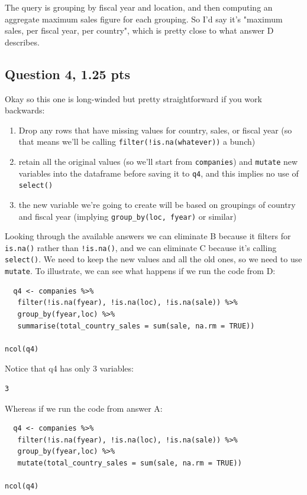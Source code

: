 \documentclass[11pt]{article}
\begin{document}
The query is grouping by fiscal year and location, and then computing an aggregate maximum sales figure for each grouping.  So I'd say it's "maximum sales, per fiscal year, per country", which is pretty close to what answer D describes.

\subsection*{Question 4, 1.25 pts}
\label{sec:orga215add}
Okay so this one is long-winded but pretty straightforward if you work backwards:

\begin{enumerate}
\item Drop any rows that have missing values for country, sales, or fiscal year (so that means we'll be calling \texttt{filter(!is.na(whatever))} a bunch)
\item retain all the original values (so we'll start from \texttt{companies}) and \texttt{mutate} new variables into the dataframe before saving it to \texttt{q4}, and this implies no use of \texttt{select()}
\item the new variable we're going to create will be based on groupings of country and fiscal year (implying \texttt{group\_by(loc, fyear)} or similar)
\end{enumerate}


Looking through the available answers we can eliminate B because it filters for \texttt{is.na()} rather than \texttt{!is.na()}, and we can eliminate C because it's calling \texttt{select()}.  We need to keep the new values and all the old ones, so we need to use \texttt{mutate}.  To illustrate, we can see what happens if we run the code from D:

\begin{verbatim}
  q4 <- companies %>%
   filter(!is.na(fyear), !is.na(loc), !is.na(sale)) %>%
   group_by(fyear,loc) %>%
   summarise(total_country_sales = sum(sale, na.rm = TRUE))

ncol(q4)
\end{verbatim}

Notice that q4 has only 3 variables:

\begin{verbatim}
3
\end{verbatim}


Whereas if we run the code from answer A:

\begin{verbatim}
  q4 <- companies %>%
   filter(!is.na(fyear), !is.na(loc), !is.na(sale)) %>%
   group_by(fyear,loc) %>%
   mutate(total_country_sales = sum(sale, na.rm = TRUE))

ncol(q4)
\end{verbatim}
\end{document}
